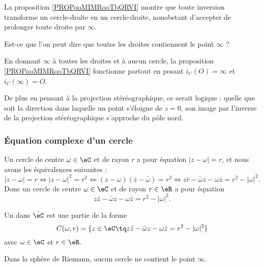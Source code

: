 \begin{probleme}        \label{PROBooZHHTooIFNwxR}
    La proposition \ref{PROPooMIMRooTbQRVI} montre que toute inversion transforme un cercle-droite en un cercle-droite, nonobstant d'accepter de prolonger toute droite par \( \infty\).

    Est-ce que l'on peut dire que toutes les droites contiennent le point \( \infty\) ?

    En donnant \( \infty\) à toutes les droites et à aucun cercle, la proposition \ref{PROPooMIMRooTbQRVI} fonctionne partout en posant \( i_C(O)=\infty\) et \( i_C(\infty)=O\).

    De plus en pensant à la projection stéréographique, ce serait logique : quelle que soit la direction dans laquelle un point s'éloigne de \( z=0\), son image par l'inverse de la projection stéréographique s'approche du pôle nord.
\end{probleme}

\subsubsection{Équation complexe d'un cercle}

Un cercle de centre \( \omega\in \eC\) et de rayon \( r\) a pour équation \( | z-\omega |=r\), et nous avons les équivalences suivantes :
\begin{equation}
    | z-\omega |=r\Leftrightarrow | z-\omega |^2=r^2\Leftrightarrow (z-\omega)(\bar z-\bar \omega)=r^2\Leftrightarrow z\bar r-\bar \omega z-\omega \bar z=r^2-| \omega |^2.
\end{equation}
Donc un cercle de centre \( \omega\in \eC\) et de rayon \( r\in \eR\) a pour équation
\begin{equation}        \label{EQooDIFRooKRZZoi}
    z\bar z-\bar\omega z-\omega\bar z=r^2-| \omega |^2.
\end{equation}

\begin{definition}
    Un  dans \( \hat\eC\) est une partie de la forme
    \begin{equation}
        C(\omega,r)=\{ z\in \eC\tq z\bar z-\bar\omega z-\omega\bar z=r^2-| \omega |^2 \}
    \end{equation}
    avec \( \omega\in \eC\) et \( r\in \eR\).
\end{definition}
Dans la sphère de Riemann, aucun cercle ne contient le point \( \infty\).

